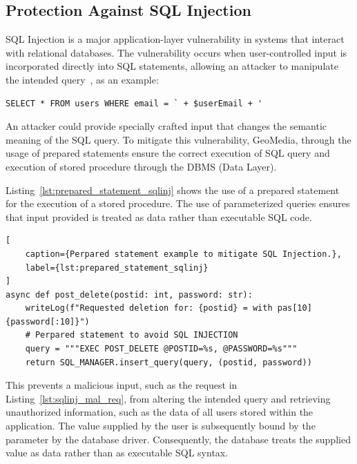 \subsection{Protection Against SQL Injection}

SQL Injection is a major application-layer vulnerability in systems that interact with relational databases. The vulnerability occurs when user-controlled input is incorporated directly into SQL statements, allowing an attacker to manipulate the intended query~\cite{article:defeating-sqlinjection}, as an example:

\begin{verbatim}
SELECT * FROM users WHERE email = ` + $userEmail + '
\end{verbatim}

An attacker could provide specially crafted input that changes the semantic meaning of the SQL query. To mitigate this vulnerability, GeoMedia, through the usage of prepared statements ensure the correct execution of SQL query and execution of stored procedure through the DBMS (Data Layer).


Listing~\ref{lst:prepared_statement_sqlinj} shows the use of a prepared statement for the execution of a stored procedure. The use of parameterized queries ensures that input provided is treated as data rather than executable SQL code. 

\begin{lstlisting}[
    caption={Perpared statement example to mitigate SQL Injection.},
    label={lst:prepared_statement_sqlinj}
]
async def post_delete(postid: int, password: str):
    writeLog(f"Requested deletion for: {postid} = with pas[10]{password[:10]}")
    # Perpared statement to avoid SQL INJECTION
    query = """EXEC POST_DELETE @POSTID=%s, @PASSWORD=%s"""
    return SQL_MANAGER.insert_query(query, (postid, password))
\end{lstlisting}

This prevents a malicious input, such as the request in Listing~\ref{lst:sqlinj_mal_req}, from altering the intended query and retrieving unauthorized information, such as the data of all users stored within the application.
The value supplied by the user is subsequently bound by the parameter by the database driver. Consequently, the database treats the supplied value as data rather than as executable SQL syntax.

